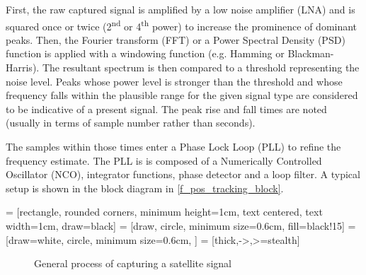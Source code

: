 First, the raw captured signal is amplified by a low noise amplifier (LNA) and is squared once or twice (2\textsuperscript{nd} or 4\textsuperscript{th} power) to increase the prominence of dominant peaks. Then, the Fourier transform (FFT) or a Power Spectral Density (PSD) function is applied with a windowing function (e.g. Hamming or Blackman-Harris). The resultant spectrum is then compared to a threshold representing the noise level. Peaks whose power level is stronger than the threshold and whose frequency falls within the plausible range for the given signal type are considered to be indicative of a present signal. The peak rise and fall times are noted (usually in terms of sample number rather than seconds). 

The samples within those times enter a Phase Lock Loop (PLL) to refine the frequency estimate. The PLL is is composed of a Numerically Controlled Oscillator
(NCO), integrator functions, phase detector and a loop filter. A typical setup is shown in the block diagram in \autoref{f_pos_tracking_block}\cite{sop03, sop04, sop05}.

 = [rectangle, rounded corners, minimum height=1cm, text centered, text width=1cm, draw=black]
 = [draw, circle, minimum size=0.6cm, fill=black!15]
 = [draw=white, circle, minimum size=0.6cm, ]
 = [thick,->,>=stealth]

\begin{figure}
\centering
{}
\caption{General process of capturing a satellite signal}
\label{f_pos_tracking_block}
\end{figure}



